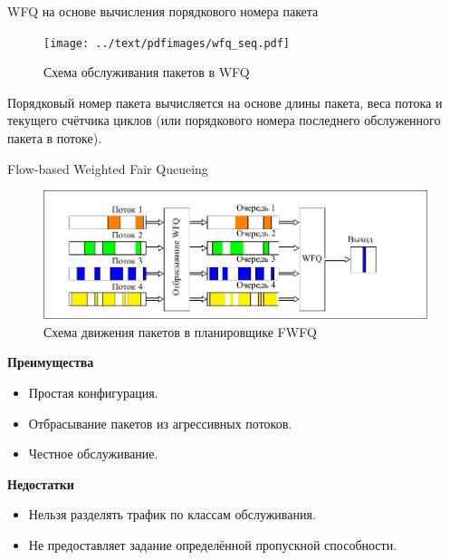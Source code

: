\documentclass[12pt]{beamer}
\begin{document}
\begin{frame}{WFQ на основе вычисления порядкового номера пакета}
	\begin{figure}
		\center
    	\texttt{[image: ../text/pdfimages/wfq\_seq.pdf]}
		\caption{Схема обслуживания пакетов в WFQ}
	\end{figure}
	
	Порядковый номер пакета вычисляется на основе длины пакета, веса потока и
	текущего счётчика циклов (или порядкового номера последнего обслуженного пакета в потоке).

\end{frame}


\begin{frame}{Flow-based Weighted Fair Queueing}
	\begin{figure}
		\center
    	\includegraphics[scale=0.6]{../text/pdfimages/fwfq.pdf}
		\caption{Схема движения пакетов в планировщике FWFQ}
	\end{figure}
	\begin{center}
        {\footnotesize
            \begin{multicols}{2}
				{\bf Преимущества}
				\begin{itemize}
					\item Простая конфигурация.
					\item Отбрасывание пакетов из агрессивных потоков.
					\item Честное обслуживание.
				\end{itemize}
            \columnbreak
				{\bf Недостатки}
				\begin{itemize}
					\item Нельзя разделять трафик по классам обслуживания.
					\item Не предоставляет задание определённой пропускной способности.
				\end{itemize}
            \end{multicols}
		}
	\end{center}
\end{frame}
\end{document}
